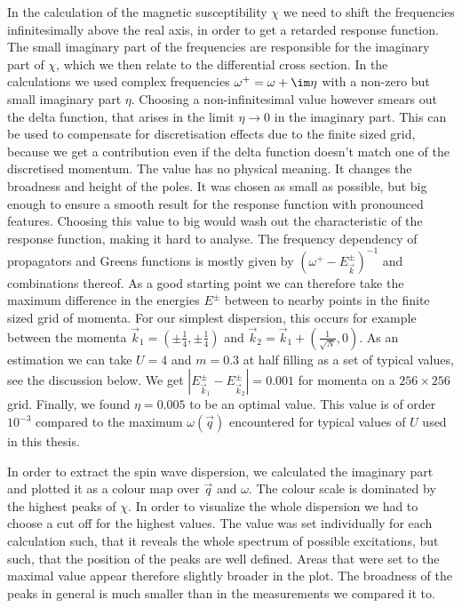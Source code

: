 In the calculation of the magnetic susceptibility $\chi$ we need to shift the frequencies infinitesimally above the real axis, 
in order to get a retarded response function. 
The small imaginary part of the frequencies are responsible for the imaginary part of $\chi$, which we then relate to the differential cross section. 
In the calculations we used complex frequencies $\omega^+ = \omega + \im \eta$ with a non-zero but small imaginary part $\eta$. 
Choosing a non-infinitesimal value however smears out the delta function, that arises in the limit $\eta \rightarrow 0$ in the imaginary part.
This can be used to compensate for discretisation effects due to the finite sized grid, because we get a contribution even if the delta function 
doesn't match one of the discretised momentum.
%
The value has no physical meaning. It changes the broadness and height of the poles. 
It was chosen as small as possible, but big enough to ensure a smooth result for the response function with pronounced features.
Choosing this value to big would wash out the characteristic of the response function, making it hard to analyse.
The frequency dependency of propagators and Greens functions is mostly given by $(\omega^+-E^{\pm}_{\vec k})^{-1}$ and combinations thereof.
As a good starting point we can therefore take the maximum difference in the energies $E^{\pm}$ between to nearby points in the finite sized grid of momenta.
For our simplest dispersion, this occurs for example  between the momenta $\vec k_1 = (\pm \frac14,\pm\frac14)$ and $\vec k_2 = \vec k_1 + (\frac1{\sqrt{N}},0)$.
As an estimation we can take $U=4$ and $m=0.3$ at half filling as a set of typical values, see the discussion below.
We get $|E^{\pm}_{\vec k_1} - E^{\pm}_{\vec k_2}| = 0.001$ for momenta on a $256\times256$ grid.
Finally, we found $\eta=0.005$ to be an optimal value.
This value is of order $10^{-3}$ compared to the maximum $\omega(\vec q)$ encountered for typical values of $U$ used in this thesis.

In order to extract the spin wave dispersion, we calculated the imaginary part and plotted it as 
a colour map over $\vec q$ and $\omega$. 
The colour scale is dominated by the highest peaks of $\chi$.
In order to visualize the whole dispersion we had to choose a cut off for the highest values. 
The value was set individually for each calculation such, that it reveals the whole spectrum of possible excitations,
but such, that the position of the peaks are well defined. 
Areas that were set to the maximal value appear therefore slightly broader in the plot. 
The broadness of the peaks in general is much smaller than in the measurements we compared it to. 

